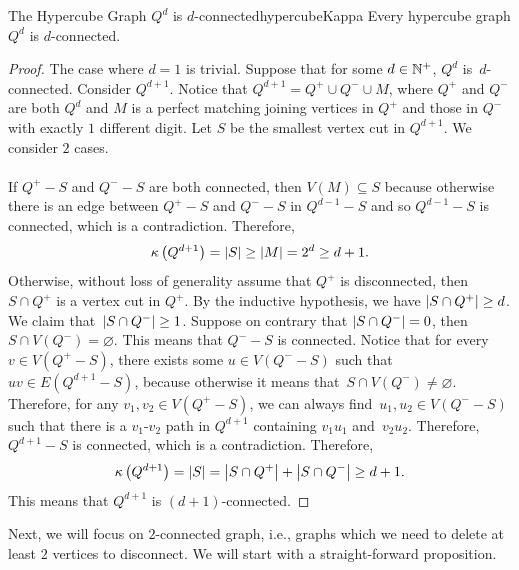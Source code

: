 \documentclass[math]{amznotes}
\theoremstyle{remark}
\newcommand{\0}{\mathbf{0}}
\newcommand{\1}{\mathbf{1}}
\begin{document}
\begin{probox}{The Hypercube Graph $Q^d$ is $d$-connected}{hypercubeKappa}
    Every hypercube graph $Q^d$ is $d$-connected.
    \tcblower
    \begin{proof}
        The case where $d = 1$ is trivial. Suppose that for some $d \in \mathbb{N}^+$, $Q^d$ is~$d$-connected. Consider $Q^{d + 1}$. Notice that $Q^{d + 1} = Q^+ \cup Q^- \cup M$, where $Q^+$ and $Q^-$ are both $Q^d$ and $M$ is a perfect matching joining vertices in $Q^+$ and those in $Q^-$ with exactly $1$ different digit. Let $S$ be the smallest vertex cut in $Q^{d + 1}$. We consider $2$ cases.
        \\\\
        If $Q^+ - S$ and $Q^- - S$ are both connected, then $V(M) \subseteq S$ because otherwise there is an edge between $Q^+ - S$ and $Q^- - S$ in $Q^{d - 1} - S$ and so $Q^{d - 1} - S$ is connected, which is a contradiction. Therefore,
        \begin{equation*}
            \kappa\left(Q^{d + 1}\right) = {\left\lvert {S} \right\rvert} \geq {\left\lvert {M} \right\rvert} = 2^{d} \geq d + 1.
        \end{equation*}
        Otherwise, without loss of generality assume that $Q^+$ is disconnected, then $S \cap Q^+$ is a vertex cut in $Q^+$. By the inductive hypothesis, we have ${\left\lvert {S \cap Q^+} \right\rvert} \geq d$. We claim that~${\left\lvert {S \cap Q^-} \right\rvert} \geq 1$. Suppose on contrary that ${\left\lvert {S \cap Q^-} \right\rvert} = 0$, then $S \cap V\left(Q^-\right) = \varnothing$. This means that $Q^- - S$ is connected. Notice that for every $v \in V\left(Q^+ - S\right)$, there exists some $u \in V\left(Q^- - S\right)$ such that $uv \in E\left(Q^{d + 1} - S\right)$, because otherwise it means that~$S \cap V\left(Q^-\right) \neq \varnothing$. Therefore, for any $v_1, v_2 \in V\left(Q^+ - S\right)$, we can always find~$u_1, u_2 \in V\left(Q^- - S\right)$ such that there is a $v_1$-$v_2$ path in $Q^{d + 1}$ containing $v_1u_1$ and~$v_2u_2$. Therefore, $Q^{d + 1} - S$ is connected, which is a contradiction. Therefore, 
        \begin{equation*}
            \kappa\left(Q^{d + 1}\right) = {\left\lvert {S} \right\rvert} = {\left\lvert {S \cap Q^+} \right\rvert} + {\left\lvert {S \cap Q^-} \right\rvert} \geq d + 1.
        \end{equation*}
        This means that $Q^{d + 1}$ is $(d + 1)$-connected.
    \end{proof}
\end{probox}
Next, we will focus on $2$-connected graph, i.e., graphs which we need to delete at least $2$ vertices to disconnect. We will start with a straight-forward proposition.
\end{document}
